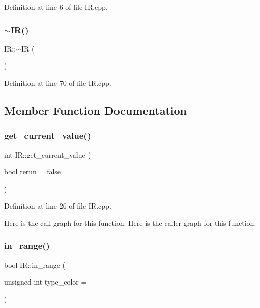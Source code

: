 Definition at line 6 of file I\+R.\+cpp.

\mbox{\label{class_i_r_acc2e758f018c7b069315a826e9ca3043}} 
\subsubsection{\texorpdfstring{$\sim$\+I\+R()}{~IR()}}
{\footnotesize\ttfamily I\+R\+::$\sim$\+IR (\begin{DoxyParamCaption}{ }\end{DoxyParamCaption})}



Definition at line 70 of file I\+R.\+cpp.



\subsection{Member Function Documentation}
\mbox{\label{class_i_r_a5b71d10f57e8dbb76cdf01e043cfdda1}} 
\subsubsection{\texorpdfstring{get\+\_\+current\+\_\+value()}{get\_current\_value()}}
{\footnotesize\ttfamily int I\+R\+::get\+\_\+current\+\_\+value (\begin{DoxyParamCaption}\item[{bool}]{rerun = {\ttfamily false} }\end{DoxyParamCaption})}



Definition at line 26 of file I\+R.\+cpp.

Here is the call graph for this function\+:
Here is the caller graph for this function\+:
\mbox{\label{class_i_r_a388cfd7a959fa4a24d8e2bad1e9d95d5}} 
\subsubsection{\texorpdfstring{in\+\_\+range()}{in\_range()}}
{\footnotesize\ttfamily bool I\+R\+::in\+\_\+range (\begin{DoxyParamCaption}\item[{unsigned int}]{type\+\_\+color = {} }\end{DoxyParamCaption})}



